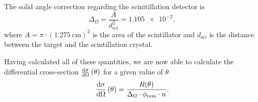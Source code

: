The solid angle correction regarding the scinitillation detector is
\begin{equation*}
	\Delta_\Omega = \frac{A}{d_\text{sci}^2} = \num{1.105e-2},
\end{equation*}
where $A=\pi\cdot\left(\SI{1.275}{\cm}\right)^2$ is the area of the scintillator and $d_\text{sci}$ is the distance between the target and the scintillation crystal.

Having calculated all of these quantities, we are now able to calculate the differential cross-section $\frac{\text{d}\sigma}{\text{d}\Omega}\left(\theta\right)$ for a given value of $\theta$
\begin{equation*}
	\frac{\text{d}\sigma}{\text{d}\Omega}\left(\theta\right) = \frac{R(\theta)}{\Delta_\Omega\cdot\phi_\text{rem}\cdot n}.
\end{equation*}
